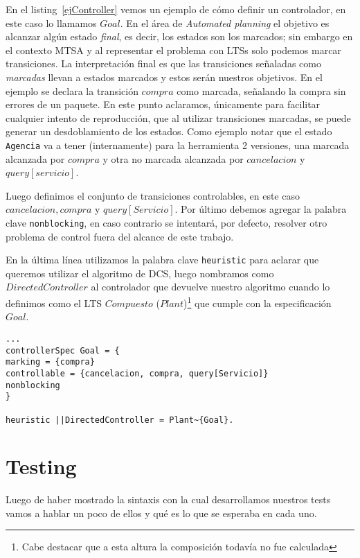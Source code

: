 En el listing~\ref{ejController} vemos un ejemplo de cómo definir un controlador, en este caso lo llamamos $Goal$. En el área de \textit{Automated planning} el objetivo es alcanzar algún estado \textit{final}, es decir, los estados son los marcados; sin embargo en el contexto MTSA y al representar el problema con LTSs solo podemos marcar transiciones. La interpretación final es que las transiciones señaladas como \textit{marcadas} llevan a estados marcados y estos serán nuestros objetivos. En el ejemplo se declara la transición $compra$ como marcada, señalando la compra sin errores de un paquete. En este punto aclaramos, únicamente para facilitar cualquier intento de reproducción, que al utilizar transiciones marcadas, se puede generar un desdoblamiento de los estados. Como ejemplo notar que el estado \texttt{Agencia} va a tener (internamente) para la herramienta 2 versiones, una marcada alcanzada por $compra$ y otra no marcada alcanzada por $cancelacion$ y $query[servicio]$.

Luego definimos el conjunto de transiciones controlables, en este caso $cancelacion, compra$ y $ query[Servicio]$. Por último debemos agregar la palabra clave \texttt{nonblocking}, en caso contrario se intentará, por defecto, resolver otro problema de control fuera del alcance de este trabajo.

En la última línea utilizamos la palabra clave \texttt{heuristic} para aclarar que queremos utilizar el algoritmo de DCS, luego nombramos como $DirectedController$ al controlador que devuelve nuestro algoritmo cuando lo definimos como el LTS $Compuesto$ ($Plant$)\footnote{Cabe destacar que a esta altura la composición todavía no fue calculada} que cumple con la especificación $Goal$.

\begin{lstlisting}[language = mtsa, caption=Ejemplo de Controller y DCS, label=ejController]
...
controllerSpec Goal = {
marking = {compra}
controllable = {cancelacion, compra, query[Servicio]}
nonblocking
}

heuristic ||DirectedController = Plant~{Goal}.
\end{lstlisting}


\section{Testing}
Luego de haber mostrado la sintaxis con la cual desarrollamos nuestros tests vamos a hablar un poco de ellos y qué es lo que se esperaba en cada uno. 

